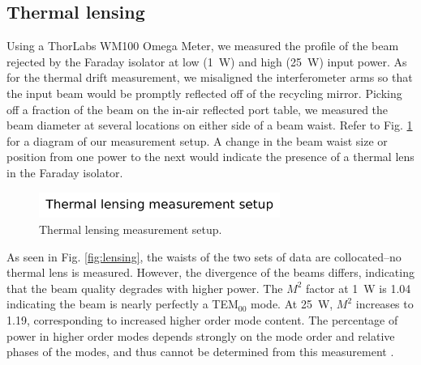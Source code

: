 \subsection{Thermal lensing}
Using a ThorLabs WM100 Omega Meter, we measured the profile of the beam rejected by the
Faraday isolator at low (1~W) and high (25~W) input power. As for the
thermal drift measurement, we misaligned the
interferometer arms so that the input beam would be promptly reflected
off of the recycling mirror. Picking off a fraction of the beam on the
in-air reflected port table, we measured the beam diameter at several
locations on either side of a beam waist. Refer to
Fig. \ref{fig:lensingsetup} for a diagram of our measurement
setup. A change in the beam waist size
or position from one power to the next would indicate the presence of
a thermal lens in the Faraday isolator. 

\begin{figure}
\begin{centering}
\includegraphics[width=0.7\textwidth]{figures/Setup_thermallensing.pdf}
\caption{Thermal lensing measurement setup.}
\label{fig:lensingsetup}
\end{centering}
\end{figure}

As seen in Fig. \ref{fig:lensing}, the waists of the two sets of data
are collocated--no thermal lens is measured. However, the divergence of
the beams differs, indicating that the beam quality degrades with
higher power. The $M^2$ factor at 1~W is 1.04 indicating the beam is
nearly perfectly a TEM$_{00}$ mode. At 25~W, $M^2$ increases to 1.19,
corresponding to increased higher order mode content. The percentage
of power in higher order modes depends strongly on the mode order and
relative phases of the modes, and thus cannot be determined from this
measurement \cite{Kwee2007Laser}.

